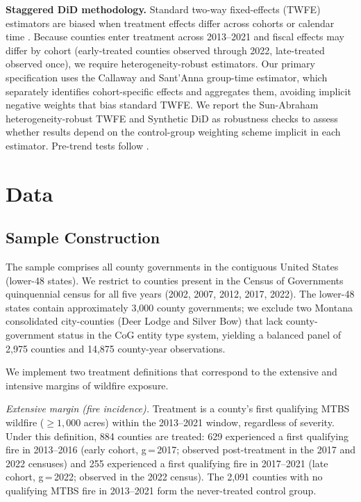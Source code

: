 \documentclass[12pt]{article}
\begin{document}
\textbf{Staggered DiD methodology.} Standard two-way fixed-effects (TWFE) estimators
are biased when treatment effects differ across cohorts or calendar time
\citep{baker2022, sun2021}. Because counties enter treatment across 2013--2021 and
fiscal effects may differ by cohort (early-treated counties observed through 2022,
late-treated observed once), we require heterogeneity-robust estimators.
Our primary specification uses the Callaway and Sant'Anna \citeyearpar{callaway2021}
group-time estimator, which separately identifies cohort-specific effects and
aggregates them, avoiding implicit negative weights that bias standard TWFE. We
report the Sun-Abraham \citeyearpar{sun2021} heterogeneity-robust TWFE and
Synthetic DiD \citep{arkhangelsky2021} as robustness checks to assess whether
results depend on the control-group weighting scheme implicit in each estimator.
Pre-trend tests follow \citet{roth2022}.

\section{Data}

\subsection{Sample Construction}

The sample comprises all county governments in the contiguous United States
(lower-48 states). We restrict to counties present in the Census of Governments
quinquennial census for all five years (2002, 2007, 2012, 2017, 2022). The lower-48
states contain approximately 3,000 county governments; we exclude two Montana
consolidated city-counties (Deer Lodge and Silver Bow) that lack county-government
status in the CoG entity type system, yielding a balanced panel of 2,975 counties
and 14,875 county-year observations.

We implement two treatment definitions that correspond to the extensive and intensive
margins of wildfire exposure.

\textit{Extensive margin (fire incidence).} Treatment is a county's first qualifying
MTBS wildfire ($\geq\!1{,}000$ acres) within the 2013--2021 window, regardless of
severity. Under this definition, 884 counties are treated: 629 experienced a first
qualifying fire in 2013--2016 (early cohort, g\,=\,2017; observed post-treatment in
the 2017 and 2022 censuses) and 255 experienced a first qualifying fire in 2017--2021
(late cohort, g\,=\,2022; observed in the 2022 census). The 2,091 counties with no
qualifying MTBS fire in 2013--2021 form the never-treated control group.
\end{document}
